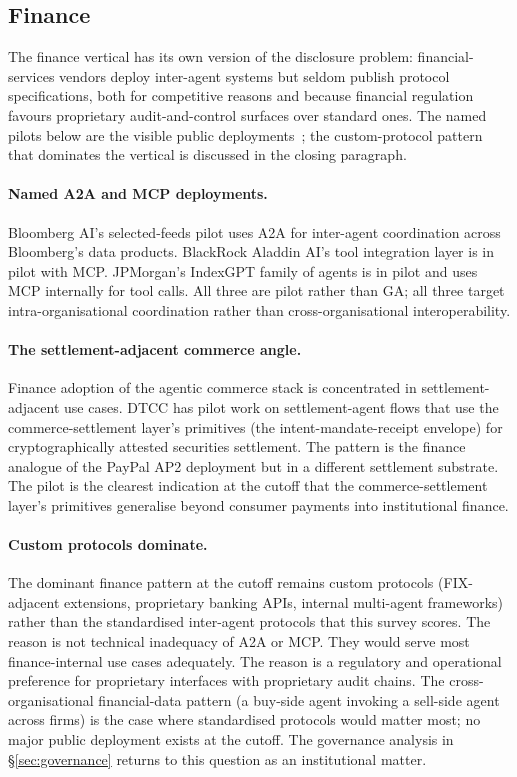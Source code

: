 \subsection{Finance}
\label{sec:adoption:finance}

The finance vertical has its own version of the
disclosure problem: financial-services vendors deploy
inter-agent systems but seldom publish protocol
specifications, both for competitive reasons and
because financial regulation favours proprietary
audit-and-control surfaces over standard ones. The
named pilots below are the visible public
deployments~\cite{vendor_announcements_2026}; the
custom-protocol pattern that dominates the vertical is
discussed in the closing paragraph.

\paragraph{Named A2A and MCP deployments.}
Bloomberg AI's selected-feeds pilot uses A2A for
inter-agent coordination across Bloomberg's data
products. BlackRock Aladdin AI's tool integration
layer is in pilot with MCP. JPMorgan's IndexGPT
family of agents is in pilot and uses MCP internally
for tool calls. All three are pilot rather than GA;
all three target intra-organisational coordination
rather than cross-organisational interoperability.

\paragraph{The settlement-adjacent commerce angle.}
Finance adoption of the agentic commerce stack is
concentrated in settlement-adjacent use cases. DTCC
has pilot work on settlement-agent flows that use the
commerce-settlement layer's primitives (the
intent-mandate-receipt envelope) for cryptographically
attested securities settlement. The pattern is the
finance analogue of the PayPal AP2 deployment but in
a different settlement substrate. The pilot is the
clearest indication at the cutoff that the
commerce-settlement layer's primitives generalise
beyond consumer payments into institutional finance.

\paragraph{Custom protocols dominate.}
The dominant finance pattern at the cutoff remains
custom protocols (FIX-adjacent extensions, proprietary
banking APIs, internal multi-agent frameworks) rather
than the standardised inter-agent protocols that this
survey scores. The reason is not technical
inadequacy of A2A or MCP. They would serve most
finance-internal use cases adequately. The reason is a
regulatory and operational preference for proprietary
interfaces with proprietary audit chains. The
cross-organisational financial-data pattern (a buy-side
agent invoking a sell-side agent across firms) is the
case where standardised protocols would matter most;
no major public deployment exists at the cutoff. The
governance analysis in \S\ref{sec:governance} returns
to this question as an institutional matter.


